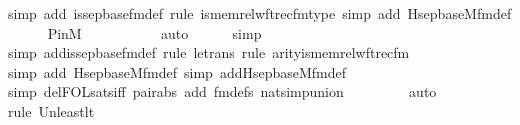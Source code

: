 \begin{isabellebody}
{\isacharparenleft}{\kern0pt}simp\ add{\isacharcolon}{\kern0pt}\ is{\isacharunderscore}{\kern0pt}sep{\isacharunderscore}{\kern0pt}base{\isacharunderscore}{\kern0pt}fm{\isacharunderscore}{\kern0pt}def{\isacharcomma}{\kern0pt}\ rule\ is{\isacharunderscore}{\kern0pt}memrel{\isacharunderscore}{\kern0pt}wftrec{\isacharunderscore}{\kern0pt}fm{\isacharunderscore}{\kern0pt}type{\isacharcomma}{\kern0pt}\ simp\ add{\isacharcolon}{\kern0pt}\ Hsep{\isacharunderscore}{\kern0pt}base{\isacharunderscore}{\kern0pt}M{\isacharunderscore}{\kern0pt}fm{\isacharunderscore}{\kern0pt}def{\isacharparenright}{\kern0pt}\isanewline
\ \ \ \ \isamarkupfalse%
\ P{\isacharunderscore}{\kern0pt}in{\isacharunderscore}{\kern0pt}M\ \isanewline
\ \ \ \ \ \ \ \ \isamarkupfalse%
\ auto{\isacharbrackleft}{\kern0pt}{}{\isacharbrackright}{\kern0pt}\isanewline
\ \ \ \ \isamarkupfalse%
\ simp\isanewline
\ \ \ \ \isamarkupfalse%
{\isacharparenleft}{\kern0pt}simp\ add{\isacharcolon}{\kern0pt}is{\isacharunderscore}{\kern0pt}sep{\isacharunderscore}{\kern0pt}base{\isacharunderscore}{\kern0pt}fm{\isacharunderscore}{\kern0pt}def{\isacharcomma}{\kern0pt}\ rule\ le{\isacharunderscore}{\kern0pt}trans{\isacharcomma}{\kern0pt}\ rule\ arity{\isacharunderscore}{\kern0pt}is{\isacharunderscore}{\kern0pt}memrel{\isacharunderscore}{\kern0pt}wftrec{\isacharunderscore}{\kern0pt}fm{\isacharparenright}{\kern0pt}\isanewline
\ \ \ \ \ \ \ \ \ \isamarkupfalse%
{\isacharparenleft}{\kern0pt}simp\ add{\isacharcolon}{\kern0pt}\ Hsep{\isacharunderscore}{\kern0pt}base{\isacharunderscore}{\kern0pt}M{\isacharunderscore}{\kern0pt}fm{\isacharunderscore}{\kern0pt}def{\isacharcomma}{\kern0pt}\ simp\ add{\isacharcolon}{\kern0pt}Hsep{\isacharunderscore}{\kern0pt}base{\isacharunderscore}{\kern0pt}M{\isacharunderscore}{\kern0pt}fm{\isacharunderscore}{\kern0pt}def{\isacharparenright}{\kern0pt}\isanewline
\ \ \ \ \ \ \ \ \isamarkupfalse%
{\isacharparenleft}{\kern0pt}simp\ del{\isacharcolon}{\kern0pt}FOL{\isacharunderscore}{\kern0pt}sats{\isacharunderscore}{\kern0pt}iff\ pair{\isacharunderscore}{\kern0pt}abs\ add{\isacharcolon}{\kern0pt}\ fm{\isacharunderscore}{\kern0pt}defs\ nat{\isacharunderscore}{\kern0pt}simp{\isacharunderscore}{\kern0pt}union{\isacharparenright}{\kern0pt}\isanewline
\ \ \ \ \ \ \ \isamarkupfalse%
\ auto{\isacharbrackleft}{\kern0pt}{}{\isacharbrackright}{\kern0pt}\isanewline
\ \ \ \ \isamarkupfalse%
{\isacharparenleft}{\kern0pt}rule\ Un{\isacharunderscore}{\kern0pt}least{\isacharunderscore}{\kern0pt}lt{\isacharparenright}{\kern0pt}{\isacharplus}{\kern0pt}\isanewline

\end{isabellebody}
